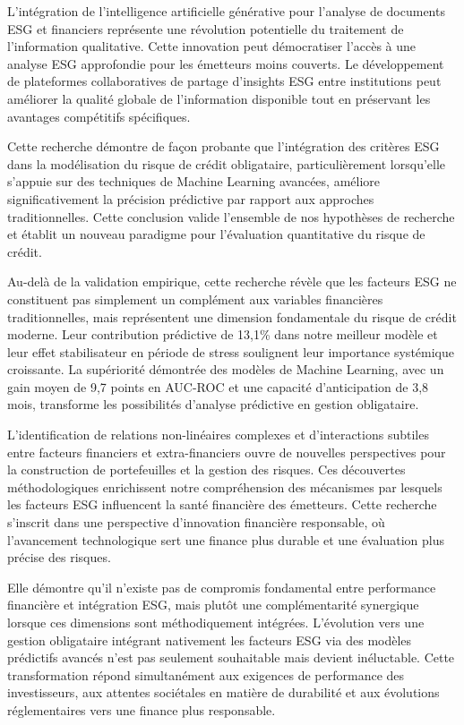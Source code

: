 L'intégration de l'intelligence artificielle générative pour l'analyse de documents ESG et financiers représente une révolution potentielle du traitement de l'information qualitative. Cette innovation peut démocratiser l'accès à une analyse ESG approfondie pour les émetteurs moins couverts. Le développement de plateformes collaboratives de partage d'insights ESG entre institutions peut améliorer la qualité globale de l'information disponible tout en préservant les avantages compétitifs spécifiques.

Cette recherche démontre de façon probante que l'intégration des critères ESG dans la modélisation du risque de crédit obligataire, particulièrement lorsqu'elle s'appuie sur des techniques de Machine Learning avancées, améliore significativement la précision prédictive par rapport aux approches traditionnelles. Cette conclusion valide l'ensemble de nos hypothèses de recherche et établit un nouveau paradigme pour l'évaluation quantitative du risque de crédit.

Au-delà de la validation empirique, cette recherche révèle que les facteurs ESG ne constituent pas simplement un complément aux variables financières traditionnelles, mais représentent une dimension fondamentale du risque de crédit moderne. Leur contribution prédictive de 13,1\% dans notre meilleur modèle et leur effet stabilisateur en période de stress soulignent leur importance systémique croissante. La supériorité démontrée des modèles de Machine Learning, avec un gain moyen de 9,7 points en AUC-ROC et une capacité d'anticipation de 3,8 mois, transforme les possibilités d'analyse prédictive en gestion obligataire.

L'identification de relations non-linéaires complexes et d'interactions subtiles entre facteurs financiers et extra-financiers ouvre de nouvelles perspectives pour la construction de portefeuilles et la gestion des risques. Ces découvertes méthodologiques enrichissent notre compréhension des mécanismes par lesquels les facteurs ESG influencent la santé financière des émetteurs. Cette recherche s'inscrit dans une perspective d'innovation financière responsable, où l'avancement technologique sert une finance plus durable et une évaluation plus précise des risques.

Elle démontre qu'il n'existe pas de compromis fondamental entre performance financière et intégration ESG, mais plutôt une complémentarité synergique lorsque ces dimensions sont méthodiquement intégrées. L'évolution vers une gestion obligataire intégrant nativement les facteurs ESG via des modèles prédictifs avancés n'est pas seulement souhaitable mais devient inéluctable. Cette transformation répond simultanément aux exigences de performance des investisseurs, aux attentes sociétales en matière de durabilité et aux évolutions réglementaires vers une finance plus responsable.


